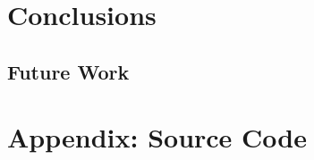 \documentclass[a4paper,12pt]{article}
\begin{document}
\section{Conclusions}


\subsection{Future Work}







\appendix
\section{Appendix: Source Code}




\end{document}

